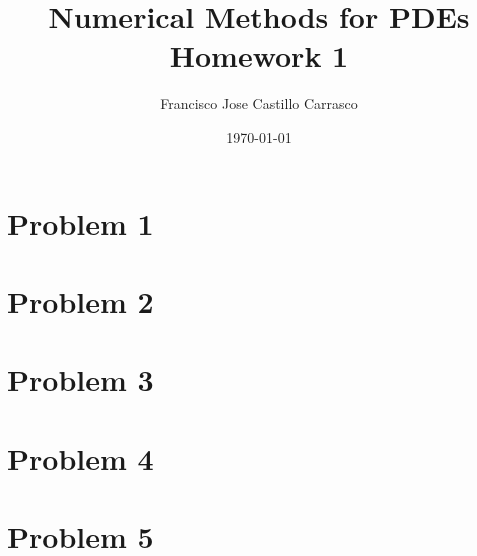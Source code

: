 




\title{Numerical Methods for PDEs\\Homework 1}
\author{Francisco Jose Castillo Carrasco}
\date{\today}
\maketitle




\section*{Problem 1}

\newpage
\section*{Problem 2}


\section*{Problem 3}


\section*{Problem 4}


\section*{Problem 5}



